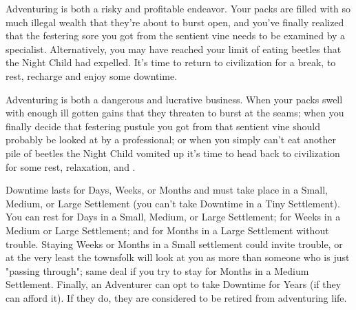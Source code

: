 
Adventuring is both a risky and profitable endeavor. Your packs are filled with so much illegal wealth that they're about to burst open, and you've finally realized that the festering sore you got from the sentient vine needs to be examined by a specialist. Alternatively, you may have reached your limit of eating beetles that the Night Child had expelled. It's time to return to civilization for a break, to rest, recharge and enjoy some downtime.

Adventuring is both a dangerous and lucrative business. When your packs swell with enough ill gotten gains that they threaten to burst at the seams; when you finally decide that festering pustule you got from that sentient vine should probably be looked at by a professional; or when you simply can't eat another pile of beetles the Night Child vomited up it's time to head back to civilization for some rest, relaxation, and .

Downtime lasts for Days, Weeks, or Months and must take place in a Small, Medium, or Large Settlement (you can't take Downtime in a Tiny Settlement). You can rest for Days in a Small, Medium, or Large Settlement; for Weeks in a Medium or Large Settlement; and for Months in a Large Settlement without trouble. Staying Weeks or Months in a Small settlement could invite trouble, or at the very least the townsfolk will look at you as more than someone who is just "passing through"; same deal if you try to stay for Months in a Medium Settlement.
Finally, an Adventurer can opt to take Downtime for Years (if they can afford it). If they do, they are considered to be retired from adventuring life.



